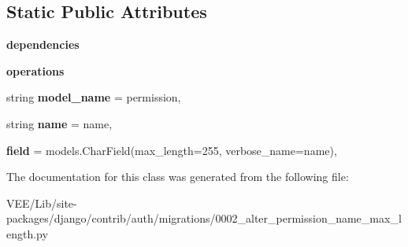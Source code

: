 \subsection*{Static Public Attributes}
\begin{DoxyCompactItemize}
\item 
\mbox{\label{classdjango_1_1contrib_1_1auth_1_1migrations_1_10002__alter__permission__name__max__length_1_1_migration_adbe1404deb637edacaf8462f3f29fe78}} 
{\bfseries dependencies}
\item 
\mbox{\label{classdjango_1_1contrib_1_1auth_1_1migrations_1_10002__alter__permission__name__max__length_1_1_migration_a84d92bcec7a1e8c242c15ae03a5b49bc}} 
{\bfseries operations}
\item 
\mbox{\label{classdjango_1_1contrib_1_1auth_1_1migrations_1_10002__alter__permission__name__max__length_1_1_migration_a6d24902a38f55607ba5af07ec1b26e81}} 
string {\bfseries model\+\_\+name} = \textquotesingle{}permission\textquotesingle{},
\item 
\mbox{\label{classdjango_1_1contrib_1_1auth_1_1migrations_1_10002__alter__permission__name__max__length_1_1_migration_a7281a45f27183c18723ec0777600e29a}} 
string {\bfseries name} = \textquotesingle{}name\textquotesingle{},
\item 
\mbox{\label{classdjango_1_1contrib_1_1auth_1_1migrations_1_10002__alter__permission__name__max__length_1_1_migration_af047a63c1b3ff59baff76cb89d38fc63}} 
{\bfseries field} = models.\+Char\+Field(max\+\_\+length=255, verbose\+\_\+name=\textquotesingle{}name\textquotesingle{}),
\end{DoxyCompactItemize}


The documentation for this class was generated from the following file\+:\begin{DoxyCompactItemize}
\item 
V\+E\+E/\+Lib/site-\/packages/django/contrib/auth/migrations/0002\+\_\+alter\+\_\+permission\+\_\+name\+\_\+max\+\_\+length.\+py\end{DoxyCompactItemize}
